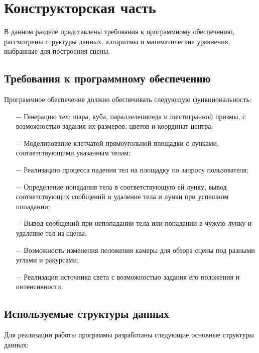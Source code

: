 \chapter{Конструкторская часть}
В данном разделе представлены требования к программному обеспечению, рассмотрены структуры данных, алгоритмы и математические уравнения, выбранные для построения сцены.

\section{Требования к программному обеспечению}

Программное обеспечение должно обеспечивать следующую функциональность:

\begin{itemize}
    \item[$-$] Генерацию тел: шара, куба, параллелепипеда и шестигранной призмы, с возможностью задания их размеров, цветов и координат центра;
    \item[$-$] Моделирование клетчатой прямоугольной площадки с лунками, соответствующими указанным телам;
    \item[$-$] Реализацию процесса падения тел на площадку по запросу пользователя;
    \item[$-$] Определение попадания тела в соответствующую ей лунку, вывод соответствующих сообщений и удаление тела и лунки при успешном попадании;
    \item[$-$] Вывод сообщений при непопадании тела или попадании в чужую лунку и удаление тел из сцены;
    \item[$-$] Возможность изменения положения камеры для обзора сцены под разными углами и ракурсами;
    \item[$-$] Реализация источника света с возможностью задания его положения и интенсивности.
\end{itemize}

\section{Используемые структуры данных}

Для реализации работы программы разработаны следующие основные структуры данных:

